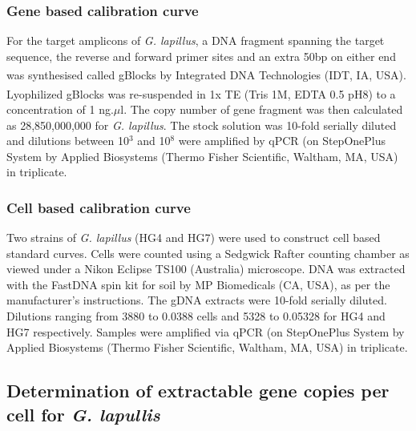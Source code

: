 \documentclass[12pt]{article}
\begin{document}
\subsubsection*{Gene based calibration curve}
For the target amplicons of \emph{G. lapillus}, a DNA fragment spanning the target sequence, the reverse and forward primer sites and an extra 50bp on either end was synthesised called gBlocks \textsuperscript{\textregistered} by Integrated DNA Technologies (IDT, IA, USA). %
Lyophilized gBlocks \textsuperscript{\textregistered} was re-suspended in 1x TE (Tris 1M, EDTA 0.5 pH8) to a concentration of 1 ng.$\mu$l. 
The copy number of gene fragment was then calculated as 28,850,000,000 
for \textit{G. lapillus}. 
The stock solution was 10-fold serially diluted and dilutions between 10$^{3}$ and 10$^{8}$ were amplified by qPCR 
(on StepOnePlus System by Applied Biosystems (Thermo Fisher Scientific, Waltham, MA, USA) in triplicate.


\subsubsection*{Cell based calibration curve}
Two strains of \emph{G. lapillus} (HG4 and HG7) 
were used to construct cell based standard curves. 
Cells were counted using a Sedgwick Rafter counting chamber as viewed under a Nikon Eclipse TS100 (Australia) microscope. 
DNA was extracted with the FastDNA spin kit for soil by MP Biomedicals (CA, USA), as per the manufacturer's instructions. 
The gDNA extracts were 10-fold serially diluted. 
Dilutions ranging from 3880 to 0.0388 cells and 5328 to 0.05328  for HG4 and HG7 respectively.  
Samples were amplified via qPCR (on StepOnePlus System by Applied Biosystems (Thermo Fisher Scientific, Waltham, MA, USA) %
in triplicate.

\subsection*{Determination of extractable gene copies per cell for \emph{G. lapullis}}%
\end{document}
